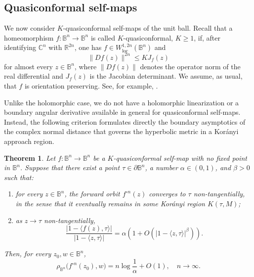 \documentclass[12pt]{amsart}
\numberwithin{equation}{section}
\theoremstyle{plain}
\newtheorem{theorem}[equation]{Theorem}
\theoremstyle{definition}
\begin{document}
\subsection{Quasiconformal self-maps}
\label{subsec:qc}

We now consider $K$-quasiconformal self-maps of the unit ball.
Recall that a homeomorphism
$f:\mathbb{B}^n\to\mathbb{B}^n$ is called $K$-quasiconformal,
$K\geq1$, if, after identifying
$\mathbb{C}^n$ with $\mathbb{R}^{2n}$, one has
$f\in W_{\mathrm{loc}}^{1,2n}(\mathbb{B}^n)$ and
\begin{equation*}
\|Df(z)\|^{2n}\leq K J_f(z)
\end{equation*}
for almost every $z\in\mathbb{B}^n$, where $\|Df(z)\|$ denotes the
operator norm of the real differential and $J_f(z)$ is the Jacobian
determinant. We assume, as usual, that $f$ is orientation preserving.
See, for example, \cite{HKV, Vuorinen}.

Unlike the holomorphic case, we do not have a holomorphic
linearization or a boundary angular derivative available in general
for quasiconformal self-maps. Instead, the following criterion
formulates directly the boundary asymptotics of the complex normal
distance that governs the hyperbolic metric in a Kor\'anyi approach
region.

\begin{theorem}
\label{thm:qc}
Let $f:\mathbb{B}^n\to\mathbb{B}^n$ be a $K$-quasiconformal
self-map with no fixed point in $\mathbb{B}^n$. Suppose that there
exist a point $\tau\in\partial\mathbb{B}^n$, a number
$\alpha\in(0,1)$, and $\beta>0$ such that:

\begin{enumerate}
\item[\emph{(i)}]
for every $z\in\mathbb{B}^n$, the forward orbit
$f^{\circ n}(z)$ converges to $\tau$ non-tangentially, in the sense
that it eventually remains in some Kor\'anyi region
$K(\tau,M)$;

\item[\emph{(ii)}]
as $z\to\tau$ non-tangentially,
\begin{equation}
\label{eq:qc_normal_asymptotic}
\frac{|1-\langle f(z),\tau\rangle|}
{|1-\langle z,\tau\rangle|}
=
\alpha\left(
1+O\!\left(|1-\langle z,\tau\rangle|^\beta\right)
\right).
\end{equation}
\end{enumerate}

Then, for every $z_0,w\in\mathbb{B}^n$,
\begin{equation}
\label{eq:qc_extremal_rate}
\rho_{\mathbb{B}^n}
\bigl(f^{\circ n}(z_0),w\bigr)
=
n\log\frac{1}{\alpha}+O(1),
\quad n\to\infty.
\end{equation}
\end{theorem}
\end{document}
